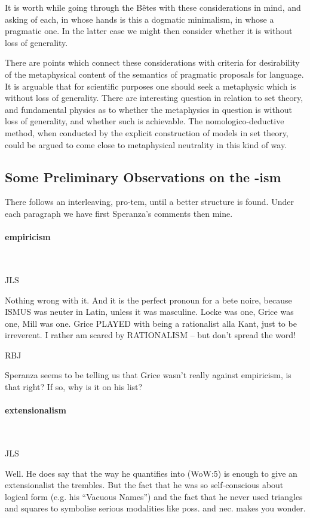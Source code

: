 \documentclass[10pt,titlepage]{book}
\begin{document}
It is worth while going through the B\^etes with these considerations in mind, and asking of each, in whose hands is this a dogmatic minimalism, in whose a pragmatic one.
In the latter case we might then consider whether it is without loss of generality.

There are points which connect these considerations with criteria for desirability of the metaphysical content of the semantics of pragmatic proposals for language.
It is arguable that for scientific purposes one should seek a metaphysic which is without loss of generality.
There are interesting question in relation to set theory, and fundamental physics as to whether the metaphysics in question is without loss of generality, and whether such is achievable.
The nomologico-deductive method, when conducted by the explicit construction of models in set theory, could be argued to come close to metaphysical neutrality in this kind of way.

 
\subsection{Some Preliminary Observations on the -ism}

There follows an interleaving, pro-tem, until a better structure is found.
Under each paragraph we have first Speranza's comments then mine.


\paragraph{empiricism}\ 

JLS

Nothing wrong with it. And it is the perfect pronoun for a bete 
 noire, because ISMUS was neuter in Latin, unless it was masculine. Locke 
was  one, Grice was one, Mill was one. Grice PLAYED with being a rationalist 
alla  Kant, just to be irreverent.
I rather am scared by RATIONALISM -- but 
don't  spread the word!
 
RBJ

Speranza seems to be telling us that Grice wasn't really against empiricism, is that right?
If so, why is it on his list?
 
\paragraph{extensionalism}\ 

JLS

Well. He does say that the way he quantifies into (WoW:5)  
is enough to give an extensionalist the trembles. But the fact that he was 
so  self-conscious about logical form (e.g. his ``Vacuous Names'') and the fact 
that  he never used triangles and squares to symbolise serious modalities 
like poss.  and nec. makes you wonder.
\end{document}

